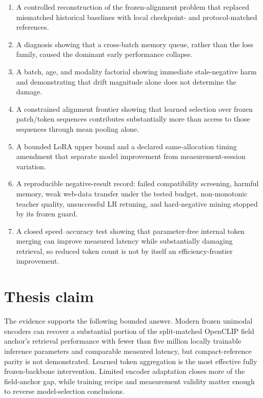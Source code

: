 \begin{enumerate}
\item A controlled reconstruction of the frozen-alignment problem that replaced mismatched historical baselines with local checkpoint- and protocol-matched references.
\item A diagnosis showing that a cross-batch memory queue, rather than the loss family, caused the dominant early performance collapse.
\item A batch, age, and modality factorial showing immediate stale-negative harm and demonstrating that drift magnitude alone does not determine the damage.
\item A constrained alignment frontier showing that learned selection over frozen patch/token sequences contributes substantially more than access to those sequences through mean pooling alone.
\item A bounded LoRA upper bound and a declared same-allocation timing amendment that separate model improvement from measurement-session variation.
\item A reproducible negative-result record: failed compatibility screening, harmful memory, weak web-data transfer under the tested budget, non-monotonic teacher quality, unsuccessful LR retuning, and hard-negative mining stopped by its frozen guard.
\item A closed speed--accuracy test showing that parameter-free internal token merging can improve measured latency while substantially damaging retrieval, so reduced token count is not by itself an efficiency-frontier improvement.
\end{enumerate}
\section{Thesis claim}
The evidence supports the following bounded answer. Modern frozen unimodal encoders can recover a substantial portion of the split-matched OpenCLIP field anchor's retrieval performance with fewer than five million locally trainable inference parameters and comparable measured latency, but compact-reference parity is not demonstrated. Learned token aggregation is the most effective fully frozen-backbone intervention. Limited encoder adaptation closes more of the field-anchor gap, while training recipe and measurement validity matter enough to reverse model-selection conclusions.

